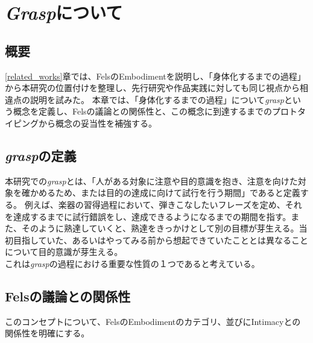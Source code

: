 \chapter{\textit{Grasp}について}
\label{graspについて}

\section{概要}
\ref{related_works}章では、FelsのEmbodimentを説明し、「身体化するまでの過程」から本研究の位置付けを整理し、先行研究や作品実践に対しても同じ視点から相違点の説明を試みた。
本章では、「身体化するまでの過程」について\textit{grasp}という概念を定義し、Felsの議論との関係性と、この概念に到達するまでのプロトタイピングから概念の妥当性を補強する。\\

\section{\textit{grasp}の定義}
本研究での\textit{grasp}とは、「人がある対象に注意や目的意識を抱き、注意を向けた対象を確かめるため、または目的の達成に向けて試行を行う期間」であると定義する。
例えば、楽器の習得過程において、弾きこなしたいフレーズを定め、それを達成するまでに試行錯誤をし、達成できるようになるまでの期間を指す。また、そのように熟達していくと、熟達をきっかけとして別の目標が芽生える。当初目指していた、あるいはやってみる前から想起できていたこととは異なることについて目的意識が芽生える。\\
これは\textit{grasp}の過程における重要な性質の１つであると考えている。

\section{Felsの議論との関係性}
このコンセプトについて、FelsのEmbodimentのカテゴリ、並びにIntimacyとの関係性を明確にする。\\

